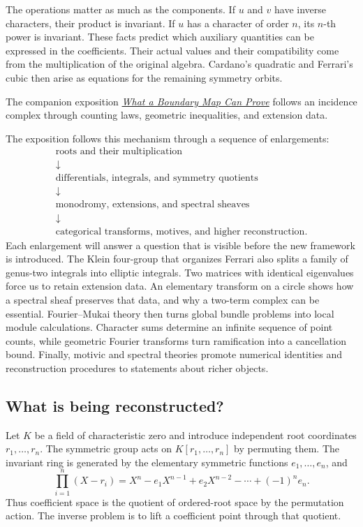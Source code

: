 \documentclass[11pt]{article}
\theoremstyle{remark}
\begin{document}
The operations matter as much as the components. If \(u\) and \(v\) have inverse characters, their product is invariant. If \(u\) has a character of order \(n\), its \(n\)-th power is invariant. These facts predict which auxiliary quantities can be expressed in the coefficients. Their actual values and their compatibility come from the multiplication of the original algebra. Cardano's quadratic and Ferrari's cubic then arise as equations for the remaining symmetry orbits.

The companion exposition \href{https://tensorgami.com/notes/what-a-boundary-map-can-prove}{\emph{What a Boundary Map Can Prove}} follows an incidence complex through counting laws, geometric inequalities, and extension data.

The exposition follows this mechanism through a sequence of enlargements:
\[
\begin{gathered}
\text{roots and their multiplication}\\
\downarrow\\
\text{differentials, integrals, and symmetry quotients}\\
\downarrow\\
\text{monodromy, extensions, and spectral sheaves}\\
\downarrow\\
\text{categorical transforms, motives, and higher reconstruction}.
\end{gathered}
\]
Each enlargement will answer a question that is visible before the new framework is introduced. The Klein four-group that organizes Ferrari also splits a family of genus-two integrals into elliptic integrals. Two matrices with identical eigenvalues force us to retain extension data. An elementary transform on a circle shows how a spectral sheaf preserves that data, and why a two-term complex can be essential. Fourier--Mukai theory then turns global bundle problems into local module calculations. Character sums determine an infinite sequence of point counts, while geometric Fourier transforms turn ramification into a cancellation bound. Finally, motivic and spectral theories promote numerical identities and reconstruction procedures to statements about richer objects.

\subsection{What is being reconstructed?}

Let \(K\) be a field of characteristic zero and introduce independent root coordinates \(r_1,\ldots,r_n\). The symmetric group acts on \(K[r_1,\ldots,r_n]\) by permuting them. The invariant ring is generated by the elementary symmetric functions \(e_1,\ldots,e_n\), and
\[
\prod_{i=1}^n(X-r_i)
=X^n-e_1X^{n-1}+e_2X^{n-2}-\cdots+(-1)^ne_n.
\]
Thus coefficient space is the quotient of ordered-root space by the permutation action. The inverse problem is to lift a coefficient point through that quotient.
\end{document}
